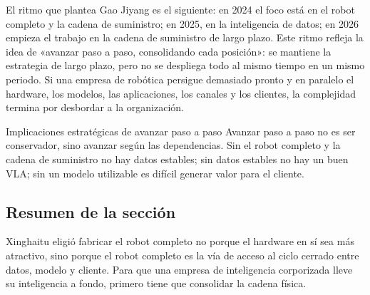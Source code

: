 El ritmo que plantea Gao Jiyang es el siguiente: en 2024 el foco está en el robot completo y la cadena de suministro; en 2025, en la inteligencia de datos; en 2026 empieza el trabajo en la cadena de suministro de largo plazo. Este ritmo refleja la idea de «avanzar paso a paso, consolidando cada posición»: se mantiene la estrategia de largo plazo, pero no se despliega todo al mismo tiempo en un mismo periodo. Si una empresa de robótica persigue demasiado pronto y en paralelo el hardware, los modelos, las aplicaciones, los canales y los clientes, la complejidad termina por desbordar a la organización.

\begin{importantbox}{Implicaciones estratégicas de avanzar paso a paso}
Avanzar paso a paso no es ser conservador, sino avanzar según las dependencias. Sin el robot completo y la cadena de suministro no hay datos estables; sin datos estables no hay un buen VLA; sin un modelo utilizable es difícil generar valor para el cliente.
\end{importantbox}

\subsection{Resumen de la sección}

Xinghaitu eligió fabricar el robot completo no porque el hardware en sí sea más atractivo, sino porque el robot completo es la vía de acceso al ciclo cerrado entre datos, modelo y cliente. Para que una empresa de inteligencia corporizada lleve su inteligencia a fondo, primero tiene que consolidar la cadena física.
